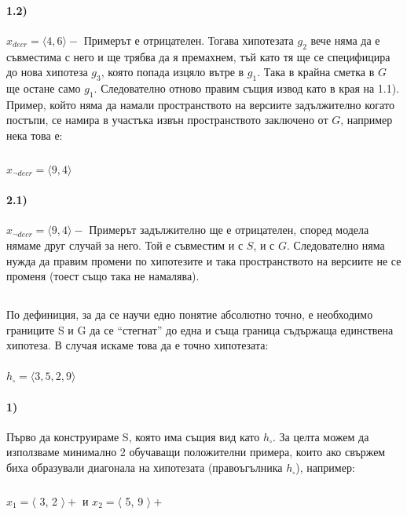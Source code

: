 \documentclass[12pt]{article}
\begin{document}
	\paragraph{1.2)} $x_{decr} = \langle 4,6 \rangle -$ \newline\newline
	Примерът е отрицателен. Тогава хипотезата $g_{2}$ вече няма да е съвместима с него и ще трябва да я премахнем, тъй като тя ще се специфицира до нова хипотеза $g_{3}$, която попада изцяло вътре в $g_{1}$. Така в крайна сметка в $G$ ще остане само $g_{1}$. Следователно отново правим същия извод като в края на 1.1).
	\newline
	\newline
	\newline
	Пример, който няма да намали пространството на версиите задължително когато постъпи, се намира в участъка извън пространството заключено от $G$, например нека това е:
	\subparagraph{}
	$x_{\neg decr} = \langle 9,4 \rangle$
	
	\paragraph{2.1)} $x_{\neg decr} = \langle 9,4 \rangle -$ \newline\newline
	Примерът задължително ще е отрицателен, според модела нямаме друг случай за него. Той е съвместим и с $S$, и с $G$. Следователно няма нужда да правим промени по хипотезите и така пространството на версиите не се променя (тоест също така не намалява).
	
	
	\subsection{}
	
	По дефиниция, за да се научи едно понятие абсолютно точно, е необходимо границите S и G да се ``стегнат'' до една и съща граница съдържаща единствена хипотеза.\newline\newline
	В случая искаме това да е точно хипотезата:
	\paragraph{}
	$h_{\square} = \langle 3, 5, 2, 9 \rangle$\newline\newline
	
	\paragraph{1)}
	Първо да конструираме S, която има същия вид като $h_{\square}$.\newline\newline
	За целта можем да използваме минимално 2 обучаващи положителни примера, които ако свържем биха образували диагонала на хипотезата (правоъгълника 	$h_{\square}$), например:
		\subparagraph{}
		$x_{1} = \langle $ 3, 2 $\rangle  +$ и $x_{2} = \langle $ 5, 9 $\rangle  +$
\end{document}

